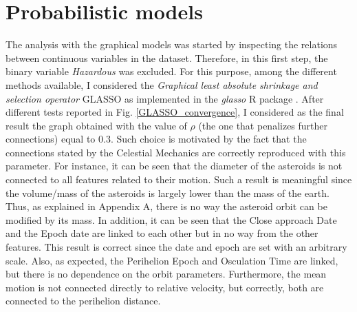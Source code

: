 \documentclass[12pt,%
               a4paper,%
               oneside,openany,%
               titlepage,%
               headinclude,footinclude,%
               BCOR5mm,%
               cleardoublepage=empty,%
               tablecaptionabove,%
               floatperchapter,
               ]{scrreprt}                 %
\begin{document}
\pagebreak

\section{Probabilistic models} The analysis with the graphical models was started by inspecting the relations between continuous variables in the dataset. Therefore, in this first step, the binary variable \textit{Hazardous} was excluded. For this purpose, among the different methods available, I considered the \textit{Graphical least absolute shrinkage and selection operator} GLASSO as implemented in the \textit{glasso} R package \cite{friedman2008sparse,glasso}. After different tests reported in Fig. \ref{GLASSO_convergence}, I considered as the final result the graph obtained with the value of $\rho$ (the one that penalizes further connections) equal to $0.3$. Such choice is motivated by the fact that the connections stated by the Celestial Mechanics are correctly reproduced with this parameter. For instance, it can be seen that the diameter of the asteroids is not connected to all features related to their motion. Such a result is meaningful since the volume/mass of the asteroids is largely lower than the mass of the earth.  Thus, as explained in Appendix A, there is no way the asteroid orbit can be modified by its mass. In addition, it can be seen that the Close approach Date and the Epoch date are linked to each other but in no way from the other features. This result is correct since the date and epoch are set with an arbitrary scale. Also, as expected, the Perihelion Epoch and Osculation Time are linked, but there is no dependence on the orbit parameters. Furthermore, the mean motion is not connected directly to relative velocity, but correctly, both are connected to the perihelion distance. 
\end{document}
